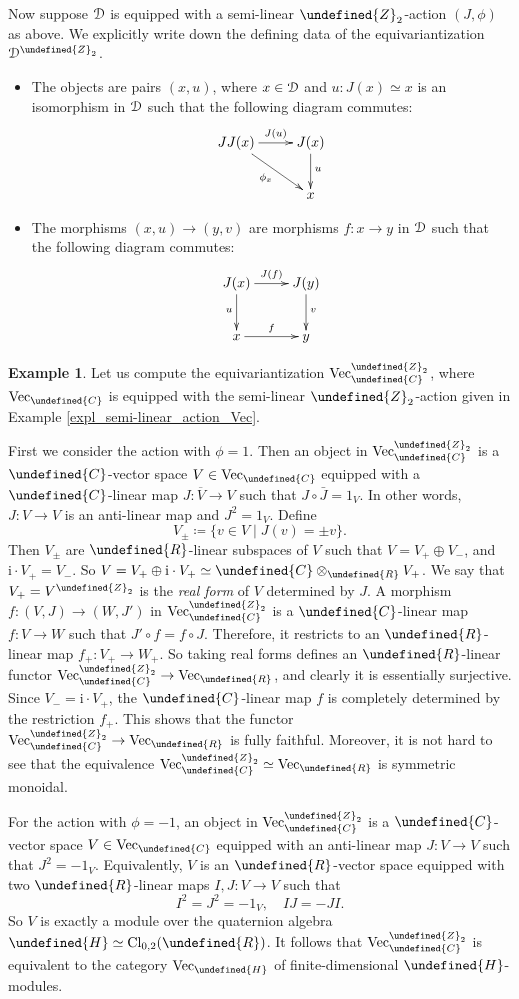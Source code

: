\documentclass[10pt]{article}
\let\mathbb\undefined
\theoremstyle{definition}
\newtheorem{expl}[thm]{Example}
\numberwithin{equation}{section}
\numberwithin{thm}{section}
\newcommand{\bit}{\begin{itemize}}
\newcommand{\eit}{\end{itemize}}
\newcommand{\Cb}{\mathbb{C}}
\newcommand{\Hb}{\mathbb{H}}
\newcommand{\Rb}{\mathbb{R}}
\newcommand{\Zb}{\mathbb{Z}}
\newcommand{\CD}{\EuScript{D}}
\newcommand{\vect}{\mathrm{Vec}}
\begin{document}
Now suppose $\CD$ is equipped with a semi-linear $\Zb_2$-action $(J,\phi)$ as above. We explicitly write down the defining data of the equivariantization $\CD^{\Zb_2}$.
\bit
\item The objects are pairs $(x,u)$, where $x \in \CD$ and $u \colon J(x) \simeq x$ is an isomorphism in $\CD$ such that the following diagram commutes:
\[
\xymatrix{
JJ(x) \ar[r]^-{J(u)} \ar[dr]_{\phi_x} & J(x) \ar[d]^{u} \\
 & x
}
\]
\item The morphisms $(x,u) \to (y,v)$ are morphisms $f \colon x \to y$ in $\CD$ such that the following diagram commutes:
\[
\xymatrix{
J(x) \ar[r]^-{J(f)} \ar[d]_{u} & J(y) \ar[d]^{v} \\
x \ar[r]^-{f} & y
}
\]
\eit

\begin{expl} \label{expl_semi-linear_equivariantization_Vec}
Let us compute the equivariantization $\vect_\Cb^{\Zb_2}$, where $\vect_\Cb$ is equipped with the semi-linear $\Zb_2$-action given in Example \ref{expl_semi-linear_action_Vec}.

First we consider the action with $\phi = 1$. Then an object in $\vect_\Cb^{\Zb_2}$ is a $\Cb$-vector space $V \in \vect_\Cb$ equipped with a $\Cb$-linear map $J \colon \overline{V} \to V$ such that $J \circ \bar J = 1_V$. In other words, $J \colon V \to V$ is an anti-linear map and $J^2 = 1_V$. Define
\[
V_\pm \coloneqq \{v \in V \mid J(v) = \pm v\} .
\]
Then $V_\pm$ are $\Rb$-linear subspaces of $V$ such that $V = V_+ \oplus V_-$, and $\mathrm i \cdot V_+ = V_-$. So $V = V_+ \oplus \mathrm i \cdot V_+ \simeq \Cb \otimes_\Rb V_+$. We say that $V_+ = V^{\Zb_2}$ is the \emph{real form} of $V$ determined by $J$. A morphism $f \colon (V,J) \to (W,J')$ in $\vect_\Cb^{\Zb_2}$ is a $\Cb$-linear map $f \colon V \to W$ such that $J' \circ f = f \circ J$. Therefore, it restricts to an $\Rb$-linear map $f_+ \colon V_+ \to W_+$. So taking real forms defines an $\Rb$-linear functor $\vect_\Cb^{\Zb_2} \to \vect_\Rb$, and clearly it is essentially surjective. Since $V_- = \mathrm i \cdot V_+$, the $\Cb$-linear map $f$ is completely determined by the restriction $f_+$. This shows that the functor $\vect_\Cb^{\Zb_2} \to \vect_\Rb$ is fully faithful. Moreover, it is not hard to see that the equivalence $\vect_\Cb^{\Zb_2} \simeq \vect_\Rb$ is symmetric monoidal.

For the action with $\phi = -1$, an object in $\vect_\Cb^{\Zb_2}$ is a $\Cb$-vector space $V \in \vect_\Cb$ equipped with an anti-linear map $J \colon V \to V$ such that $J^2 = -1_V$. Equivalently, $V$ is an $\Rb$-vector space equipped with two $\Rb$-linear maps $I,J \colon V \to V$ such that
\[
I^2 = J^2 = -1_V , \quad IJ = -JI .
\]
So $V$ is exactly a module over the quaternion algebra $\Hb \simeq \mathrm{Cl}_{0,2}(\Rb)$. It follows that $\vect_\Cb^{\Zb_2}$ is equivalent to the category $\vect_\Hb$ of finite-dimensional $\Hb$-modules.
\end{expl}
\end{document}
